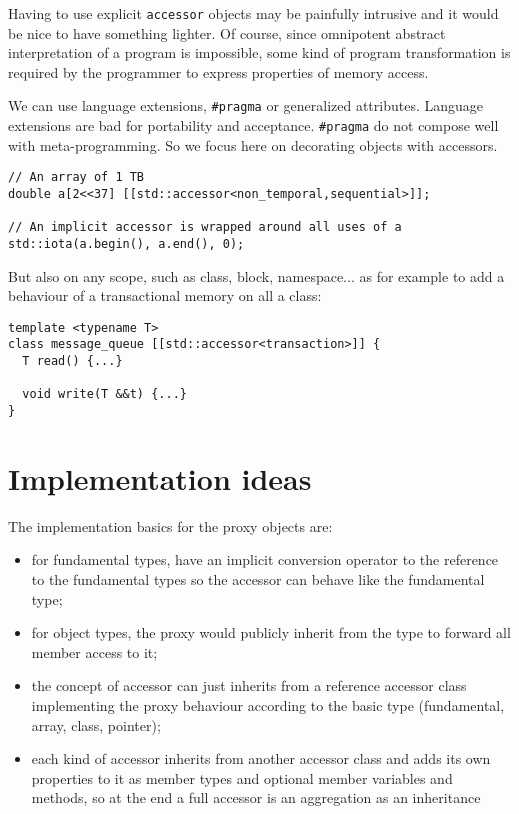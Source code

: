 \documentclass[a4paper]{article}
\begin{document}
Having to use explicit \texttt{accessor} objects may be painfully
intrusive and it would be nice to have something lighter. Of course,
since omnipotent abstract interpretation of a program is impossible,
some kind of program transformation is required by the programmer to
express properties of memory access.

We can use language extensions, \lstinline|#pragma| or generalized
attributes. Language extensions are bad for portability and
acceptance. \lstinline|#pragma| do not compose well with
meta-programming. So we focus here on decorating objects with
accessors.

\begin{lstlisting}
// An array of 1 TB
double a[2<<37] [[std::accessor<non_temporal,sequential>]];

// An implicit accessor is wrapped around all uses of a
std::iota(a.begin(), a.end(), 0);
\end{lstlisting}

But also on any scope, such as class, block, namespace... as for
example to add a behaviour of a transactional memory on all a class:
\begin{lstlisting}
template <typename T>
class message_queue [[std::accessor<transaction>]] {
  T read() {...}

  void write(T &&t) {...}
}
\end{lstlisting}


\section{Implementation ideas}
\label{sec:implementation-ideas}

The implementation basics for the proxy objects are:
\begin{itemize}
\item for fundamental types, have an implicit conversion operator to
  the reference to the fundamental types so the accessor can behave
  like the fundamental type;
\item for object types, the proxy would publicly inherit from the type to
  forward all member access to it;
\item the concept of accessor can just inherits from a reference
  accessor class implementing the proxy behaviour according to the
  basic type (fundamental, array, class, pointer);
\item each kind of accessor inherits from another accessor class and
  adds its own properties to it as member types and optional member
  variables and methods, so at the end a full accessor is an
  aggregation as an inheritance 
\end{itemize}
\end{document}
